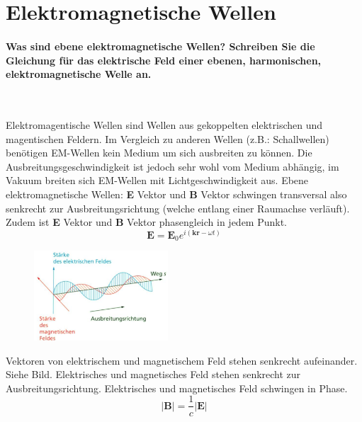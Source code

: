 \documentclass[a4paper, 11pt, ngerman, parskip=half-]{scrartcl}
\begin{document}
\newpage

\section{Elektromagnetische Wellen}

\paragraph{Was sind ebene elektromagnetische Wellen? Schreiben Sie die Gleichung für das elektrische
Feld einer ebenen, harmonischen, elektromagnetische Welle an.} ~

Elektromagentische Wellen sind Wellen aus gekoppelten elektrischen und magentischen Feldern. Im Vergleich zu anderen Wellen (z.B.: Schallwellen) benötigen
EM-Wellen kein Medium um sich ausbreiten zu können. Die Ausbreitungsgeschwindigkeit ist jedoch sehr wohl vom Medium abhängig, im Vakuum breiten sich EM-Wellen mit Lichtgeschwindigkeit aus.
Ebene elektromagnetische Wellen: \textbf{E} Vektor und \textbf{B} Vektor schwingen transversal also senkrecht zur Ausbreitungsrichtung (welche entlang einer Raumachse verläuft).
Zudem ist \textbf{E} Vektor und \textbf{B} Vektor phasengleich in jedem Punkt. 
\begin{equation}
    \textbf{E} = \textbf{E}_0 e^{i(\textbf{kr} - \omega t)}
\end{equation}

\begin{figure}[H]
    \centering
    \includegraphics[width=5cm]{image/13/1.png}
\end{figure}

Vektoren von elektrischem und magnetischem Feld stehen senkrecht aufeinander. Siehe Bild.
Elektrisches und magnetisches Feld stehen senkrecht zur Ausbreitungsrichtung. Elektrisches und
magnetisches Feld schwingen in Phase.
\begin{equation}
|\textbf{B}| = \frac{1}{c} |\textbf{E}|
\end{equation}
\end{document}
